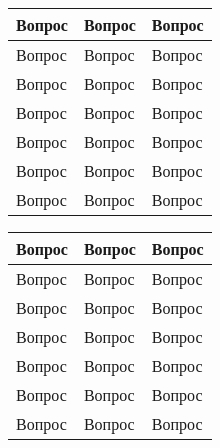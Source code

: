 
\usepackage{multicol}
\usepackage{tabularx}
\newdimen{\blankheight}
\newdimen{\blankwidth}
\newcommand{\cell}{\vspace{0.2em}\hspace{1.5em}{\hrulefill}\hspace{\blankwidth}Вопрос \arabic{Questions}\stepcounter{Questions}\hspace{1.5em} \vspace{\blankheight}}

\begin{tabularx}{\textwidth}{>{\raggedright\arraybackslash}X|>{\raggedright\arraybackslash}X|>{\raggedright\arraybackslash}X}
\cell & \cell & \cell \\ \hline
\cell & \cell & \cell \\ \hline
\cell & \cell & \cell \\ \hline
\cell & \cell & \cell \\ \hline
\cell & \cell & \cell \\ \hline
\cell & \cell & \cell \\ \hline
\cell & \cell & \cell \\ \hline

\end{tabularx}
\clearpage
\begin{tabularx}{\textwidth}{>{\raggedright\arraybackslash}X|>{\raggedright\arraybackslash}X|>{\raggedright\arraybackslash}X}
\cell & \cell & \cell \\ \hline
\cell & \cell & \cell \\ \hline
\cell & \cell & \cell \\ \hline
\cell & \cell & \cell \\ \hline
\cell & \cell & \cell \\ \hline
\cell & \cell & \cell \\ \hline
\cell & \cell & \cell \\ \hline

\end{tabularx}


